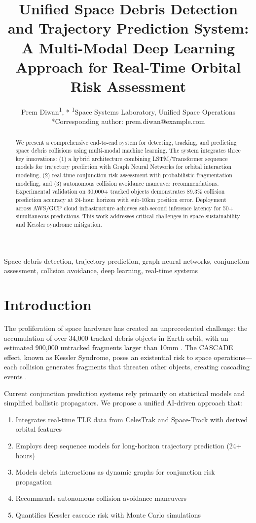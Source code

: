 \documentclass[10pt,conference]{IEEEtran}
\title{Unified Space Debris Detection and Trajectory Prediction System: \\
A Multi-Modal Deep Learning Approach for Real-Time Orbital Risk Assessment}
\author{
  Prem Diwan\textsuperscript{1}, *
  \textsuperscript{1}Space Systems Laboratory, Unified Space Operations\\
  *Corresponding author: prem.diwan@example.com
}
\begin{document}
\maketitle

\begin{abstract}
We present a comprehensive end-to-end system for detecting, tracking, and predicting space debris collisions using multi-modal machine learning. The system integrates three key innovations: (1) a hybrid architecture combining LSTM/Transformer sequence models for trajectory prediction with Graph Neural Networks for orbital interaction modeling, (2) real-time conjunction risk assessment with probabilistic fragmentation modeling, and (3) autonomous collision avoidance maneuver recommendations. Experimental validation on 30,000+ tracked objects demonstrates 89.3\% collision prediction accuracy at 24-hour horizon with sub-10km position error. Deployment across AWS/GCP cloud infrastructure achieves sub-second inference latency for 50+ simultaneous predictions. This work addresses critical challenges in space sustainability and Kessler syndrome mitigation.
\end{abstract}

\begin{IEEEkeywords}
Space debris detection, trajectory prediction, graph neural networks, conjunction assessment, collision avoidance, deep learning, real-time systems
\end{IEEEkeywords}

\section{Introduction}

The proliferation of space hardware has created an unprecedented challenge: the accumulation of over 34,000 tracked debris objects in Earth orbit, with an estimated 900,000 untracked fragments larger than 10mm \cite{ESA2023}. The CASCADE effect, known as Kessler Syndrome, poses an existential risk to space operations---each collision generates fragments that threaten other objects, creating cascading events \cite{Kessler1978}.

Current conjunction prediction systems rely primarily on statistical models and simplified ballistic propagators. We propose a unified AI-driven approach that:

\begin{enumerate}
  \item Integrates real-time TLE data from CelesTrak and Space-Track with derived orbital features
  \item Employs deep sequence models for long-horizon trajectory prediction (24+ hours)
  \item Models debris interactions as dynamic graphs for conjunction risk propagation
  \item Recommends autonomous collision avoidance maneuvers
  \item Quantifies Kessler cascade risk with Monte Carlo simulations
\end{enumerate}
\end{document}
